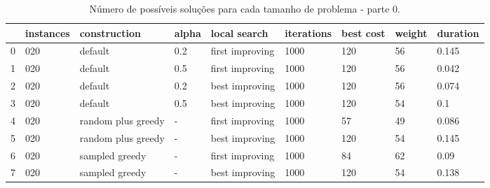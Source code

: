 \begin{landscape}

    \begin{table}
    \centering
    \begin{tabular}{lllllllll}
    \toprule
    {} & instances &        construction & alpha &     local search & iterations & best cost & weight & duration \\
    \midrule
    0 &       020 &             default &   0.2 &  first improving &       1000 &       120 &     56 &    0.145 \\
    1 &       020 &             default &   0.5 &  first improving &       1000 &       120 &     56 &    0.042 \\
    2 &       020 &             default &   0.2 &   best improving &       1000 &       120 &     56 &    0.074 \\
    3 &       020 &             default &   0.5 &   best improving &       1000 &       120 &     54 &      0.1 \\
    4 &       020 &  random plus greedy &     - &  first improving &       1000 &        57 &     49 &    0.086 \\
    5 &       020 &  random plus greedy &     - &   best improving &       1000 &       120 &     54 &    0.145 \\
    6 &       020 &      sampled greedy &     - &  first improving &       1000 &        84 &     62 &     0.09 \\
    7 &       020 &      sampled greedy &     - &   best improving &       1000 &       120 &     54 &    0.138 \\
    \bottomrule
    \end{tabular}
    \caption{Número de possíveis soluções para cada tamanho de problema - parte 0.}
    \label{table:all-data-0}
    \end{table}


\end{landscape}
